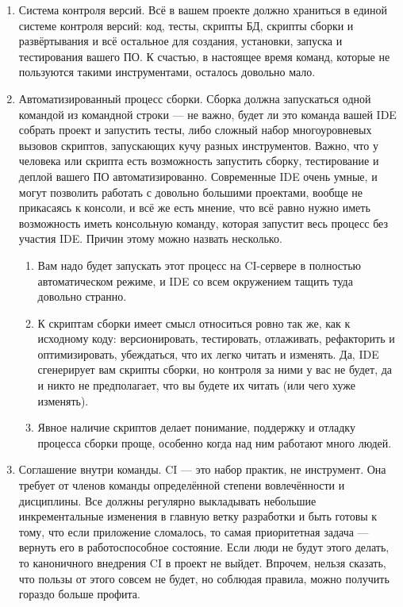 \documentclass{../../text-style}
\begin{document}
\begin{enumerate}
    \item Система контроля версий. Всё в вашем проекте должно храниться в единой системе контроля версий: код, тесты, скрипты БД, скрипты сборки и развёртывания и всё остальное для создания, установки, запуска и тестирования вашего ПО. К счастью, в настоящее время команд, которые не пользуются такими инструментами, осталось довольно мало.
    \item Автоматизированный процесс сборки. Сборка должна запускаться одной командой из командной строки --- не важно, будет ли это команда вашей IDE собрать проект и запустить тесты, либо сложный набор многоуровневых вызовов скриптов, запускающих кучу разных инструментов. Важно, что у человека или скрипта есть возможность запустить сборку, тестирование и деплой вашего ПО автоматизированно. Современные IDE очень умные, и могут позволить работать с довольно большими проектами, вообще не прикасаясь к консоли, и всё же есть мнение, что всё равно нужно иметь возможность иметь консольную команду, которая запустит весь процесс без участия IDE. Причин этому можно назвать несколько.
    \begin{enumerate}
        \item Вам надо будет запускать этот процесс на CI-сервере в полностью автоматическом режиме, и IDE со всем окружением тащить туда довольно странно.
        \item К скриптам сборки имеет смысл относиться ровно так же, как к исходному коду: версионировать, тестировать, отлаживать, рефакторить и оптимизировать, убеждаться, что их легко читать и изменять. Да, IDE сгенерирует вам скрипты сборки, но контроля за ними у вас не будет, да и никто не предполагает, что вы будете их читать (или чего хуже изменять).
        \item Явное наличие скриптов делает понимание, поддержку и отладку процесса сборки проще, особенно когда над ним работают много людей.
    \end{enumerate}
    \item Соглашение внутри команды. CI --- это набор практик, не инструмент. Она требует от членов команды определённой степени вовлечённости и дисциплины. Все должны регулярно выкладывать небольшие инкрементальные изменения в главную ветку разработки и быть готовы к тому, что если приложение сломалось, то самая приоритетная задача --- вернуть его в работоспособное состояние. Если люди не будут этого делать, то каноничного внедрения CI в проект не выйдет. Впрочем, нельзя сказать, что пользы от этого совсем не будет, но соблюдая правила, можно получить гораздо больше профита.
\end{enumerate}
\end{document}
